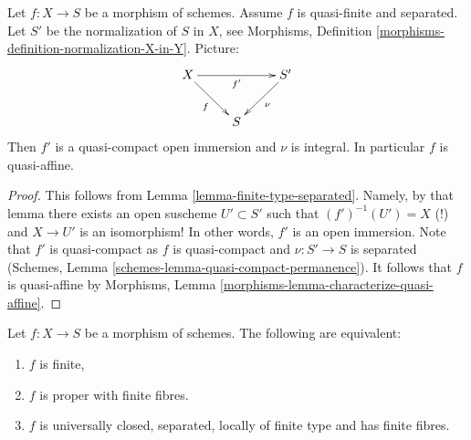 \begin{lemma}
\label{lemma-quasi-finite-separated-quasi-affine}
Let $f : X \to S$ be a morphism of schemes.
Assume $f$ is quasi-finite and separated.
Let $S'$ be the normalization of $S$ in $X$, see
Morphisms, Definition \ref{morphisms-definition-normalization-X-in-Y}.
Picture:
$$
\xymatrix{
X \ar[rd]_f \ar[rr]_{f'} & & S' \ar[ld]^\nu \\
& S &
}
$$
Then $f'$ is a quasi-compact open immersion and $\nu$ is integral.
In particular $f$ is quasi-affine.
\end{lemma}

\begin{proof}
This follows from Lemma \ref{lemma-finite-type-separated}. Namely, by
that lemma there exists an open suscheme $U' \subset S'$ such that
$(f')^{-1}(U') = X$ (!) and $X \to U'$ is an isomorphism! In other
words, $f'$ is an open immersion. Note that $f'$ is quasi-compact as
$f$ is quasi-compact and $\nu : S' \to S$ is separated
(Schemes, Lemma \ref{schemes-lemma-quasi-compact-permanence}).
It follows that $f$ is quasi-affine by
Morphisms, Lemma \ref{morphisms-lemma-characterize-quasi-affine}.
\end{proof}

\begin{lemma}
\label{lemma-characterize-finite}
Let $f : X \to S$ be a morphism of schemes.
The following are equivalent:
\begin{enumerate}
\item $f$ is finite,
\item $f$ is proper with finite fibres.
\item $f$ is universally closed, separated, locally of finite type
and has finite fibres.
\end{enumerate}
\end{lemma}

